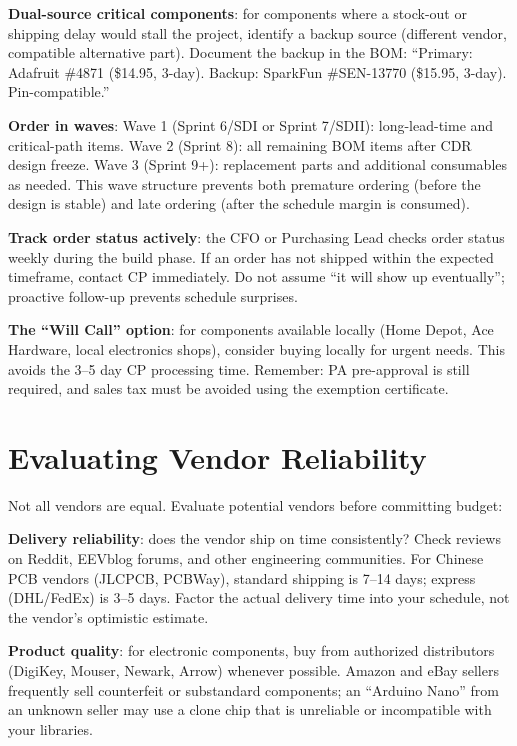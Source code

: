 \textbf{Dual-source critical components}: for components where a stock-out or shipping delay would stall the project, identify a backup source (different vendor, compatible alternative part). Document the backup in the BOM: ``Primary: Adafruit \#4871 (\$14.95, 3-day). Backup: SparkFun \#SEN-13770 (\$15.95, 3-day). Pin-compatible.''

\textbf{Order in waves}: Wave 1 (Sprint 6/SDI or Sprint 7/SDII): long-lead-time and critical-path items. Wave 2 (Sprint 8): all remaining BOM items after CDR design freeze. Wave 3 (Sprint 9+): replacement parts and additional consumables as needed. This wave structure prevents both premature ordering (before the design is stable) and late ordering (after the schedule margin is consumed).

\textbf{Track order status actively}: the CFO or Purchasing Lead checks order status weekly during the build phase. If an order has not shipped within the expected timeframe, contact CP immediately. Do not assume ``it will show up eventually''; proactive follow-up prevents schedule surprises.

\textbf{The ``Will Call'' option}: for components available locally (Home Depot, Ace Hardware, local electronics shops), consider buying locally for urgent needs. This avoids the 3--5 day CP processing time. Remember: PA pre-approval is still required, and sales tax must be avoided using the exemption certificate.



\section{Evaluating Vendor Reliability}
Not all vendors are equal. Evaluate potential vendors before committing budget:

\textbf{Delivery reliability}: does the vendor ship on time consistently? Check reviews on Reddit, EEVblog forums, and other engineering communities. For Chinese PCB vendors (JLCPCB, PCBWay), standard shipping is 7--14 days; express (DHL/FedEx) is 3--5 days. Factor the actual delivery time into your schedule, not the vendor's optimistic estimate.

\textbf{Product quality}: for electronic components, buy from authorized distributors (DigiKey, Mouser, Newark, Arrow) whenever possible. Amazon and eBay sellers frequently sell counterfeit or substandard components; an ``Arduino Nano'' from an unknown seller may use a clone chip that is unreliable or incompatible with your libraries.

